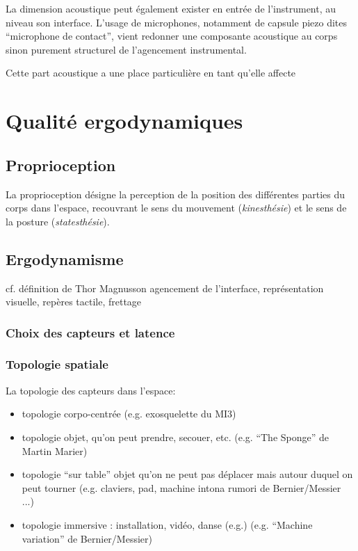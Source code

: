 La dimension acoustique peut également exister en entrée de l'instrument, au niveau son interface. L'usage de microphones, notamment de capsule piezo dites ``microphone de contact'', vient redonner une composante acoustique au corps sinon purement structurel de l'agencement instrumental.

Cette part acoustique a une place particulière en tant qu'elle affecte 



\section{Qualité ergodynamiques}


\subsection{Proprioception}
La proprioception désigne la perception de la position des différentes parties du corps dans l'espace, recouvrant le sens du mouvement (\textit{kinesthésie}) et le sens de la posture (\textit{statesthésie}).


\subsection{Ergodynamisme}
cf. définition de Thor Magnusson
agencement de l’interface, représentation visuelle, repères tactile, frettage

\subsubsection{Choix des capteurs et latence}




\subsubsection{Topologie spatiale}

La topologie des capteurs dans l'espace:
\vspace{-1em}
\begin{itemize}[noitemsep]
	\item topologie corpo-centrée (e.g. exosquelette du MI3)
	\item topologie objet, qu'on peut prendre, secouer, etc. (e.g. ``The Sponge'' de Martin Marier)
	\item topologie ``sur table'' objet qu'on ne peut pas déplacer mais autour duquel on peut tourner (e.g. claviers, pad, machine intona rumori de Bernier/Messier ...)
	\item topologie immersive : installation, vidéo, danse (e.g.) (e.g. ``Machine variation'' de Bernier/Messier)
\end{itemize}




